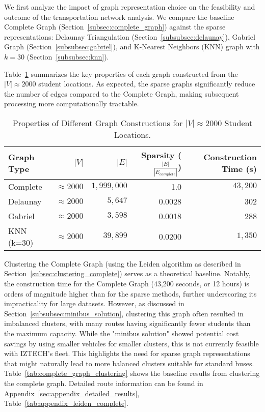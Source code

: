 We first analyze the impact of graph representation choice on the feasibility and outcome of the transportation network analysis. We compare the baseline Complete Graph (Section~\ref{subsec:complete_graph}) against the sparse representations: Delaunay Triangulation (Section~\ref{subsubsec:delaunay}), Gabriel Graph (Section~\ref{subsubsec:gabriel}), and K-Nearest Neighbors (KNN) graph with $k=30$ (Section~\ref{subsubsec:knn}).

Table~\ref{tab:graph_properties} summarizes the key properties of each graph constructed from the $|V| \approx 2000$ student locations. As expected, the sparse graphs significantly reduce the number of edges compared to the Complete Graph, making subsequent processing more computationally tractable.

\begin{table}[h]
    \centering
    \label{tab:graph_properties}
    \begin{tabular}{lrrrr}
    \toprule
    Graph Type & $|V|$ & $|E|$ & Sparsity ($\frac{|E|}{|E_{complete}|}$) & Construction Time (s) \\
    \midrule
    Complete & $\approx 2000$ & $ 1,999,000$ & 1.0 & $ 43,200$ \\
    Delaunay & $\approx 2000$ & $ 5,647$ & 0.0028 & 302 \\
    Gabriel & $\approx 2000$ & $ 3,598$ & 0.0018 & 288 \\
    KNN (k=30) & $\approx 2000$ & $ 39,899$ & 0.0200 & $ 1,350$ \\
    \bottomrule
    \end{tabular}
    \caption{Properties of Different Graph Constructions for $|V| \approx 2000$ Student Locations.}
    \end{table}

Clustering the Complete Graph (using the Leiden algorithm as described in Section~\ref{subsec:clustering_complete}) serves as a theoretical baseline. Notably, the construction time for the Complete Graph (43,200 seconds, or 12 hours) is orders of magnitude higher than for the sparse methods, further underscoring its impracticality for large datasets. However, as discussed in Section~\ref{subsubsec:minibus_solution}, clustering this graph often resulted in imbalanced clusters, with many routes having significantly fewer students than the maximum capacity. While the "minibus solution" showed potential cost savings by using smaller vehicles for smaller clusters, this is not currently feasible with IZTECH's fleet. This highlights the need for sparse graph representations that might naturally lead to more balanced clusters suitable for standard buses. Table~\ref{tab:complete_graph_clustering} shows the baseline results from clustering the complete graph. Detailed route information can be found in Appendix~\ref{sec:appendix_detailed_results}, Table~\ref{tab:appendix_leiden_complete}.

